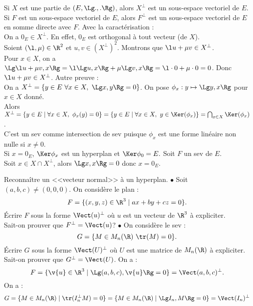 \documentclass[11pt]{article}
\begin{document}
\begin{prop}{}{}
    Si $X$ est une partie de $(E,\Lg.,.\Rg)$, alors $X^\bot$ est un sous-espace vectoriel de $E$.\\
    Si $F$ est un sous-espace vectoriel de $E$, alors $F^\bot$ est un sous-espace vectoriel de $E$ en somme directe avec $F$.
    \tcblower
     Avec la caractérisation :\\
    On a $0_E\in X^\bot$. En effet, $0_E$ est orthogonal à tout vecteur (de $X$).\\
    Soient $(\l, \mu)\in \R^2$ et $u,v\in (X^\bot)^2$. Montrons que $\l u + \mu v \in X^\bot$.\\
    Pour $x\in X$, on a $\Lg \l u + \mu v, x \Rg = \l \Lg u, x \Rg + \mu \Lg v, x \Rg = \l\cdot0 + \mu\cdot0 = 0$. Donc $\l u + \mu v \in X^\bot$.\n
     Autre preuve :\\
    On a $X^\bot = \{y \in E ~ \forall x \in X, ~ \Lg x, y \Rg = 0\}$. On pose $\phi_x : y\mapsto \Lg y , x \Rg$ pour $x\in X$ donné.\\
    Alors $X^\bot=\{y\in E \mid \forall x \in X, ~ \phi_x(y)=0\}=\{y \in E \mid \forall x \in X, ~ y \in \Ker(\phi_x)\}=\bigcap_{x\in X}\Ker(\phi_x)$.\\
    C'est un sev comme intersection de sev puisque $\phi_x$ est une forme linéaire non nulle si $x\neq0$.\\
    Si $x=0_E$, $\Ker\phi_x$ est un hyperplan et $\Ker \phi_0=E.$\n
     Soit $F$ un sev de $E$.\\
    Soit $x\in X\cap X^\bot$, alors $\Lg x, x \Rg = 0$ donc $x=0_E$.
\end{prop}

\begin{ex}{Reconnaître un <<vecteur normal>> à un hyperplan.}{}
    $\bullet$ Soit $(a,b,c)\neq(0,0,0)$. On considère le plan :
    \begin{equation*}
        F=\{(x,y,z)\in\R^3 \mid ax + by + cz = 0\}.
    \end{equation*}
    Écrire $F$ sous la forme $\Vect(u)^\bot$ où $u$ est un vecteur de $\R^3$ à expliciter.\\
    Sait-on prouver que $F^\bot=\Vect(u)$?\n
    $\bullet$ On considère le sev :
    \begin{equation*}
        G=\{M\in M_n(\R) ~ \tr(M)=0\}.
    \end{equation*}
    Écrire $G$ sous la forme $\Vect(U)^\bot$ où $U$ est une matrice de $M_n(\R)$ à expliciter.\\
    Sait-on prouver que $G^\bot=\Vect(U)$.
    \tcblower
    On a :
    \begin{equation*}
        F=\{\v{u}\in\R^3 \mid \Lg (a,b,c), \v{u} \Rg = 0\} = \Vect(a,b,c)^\bot.
    \end{equation*}
    On a :
    \begin{equation*}
        G=\{M\in M_n(\R) \mid \tr(I_n^\bot M)=0\}=\{M\in M_n(\R) \mid \Lg I_n, M \Rg = 0\}=\Vect(I_n)^\bot
    \end{equation*}
\end{ex}
\end{document}
